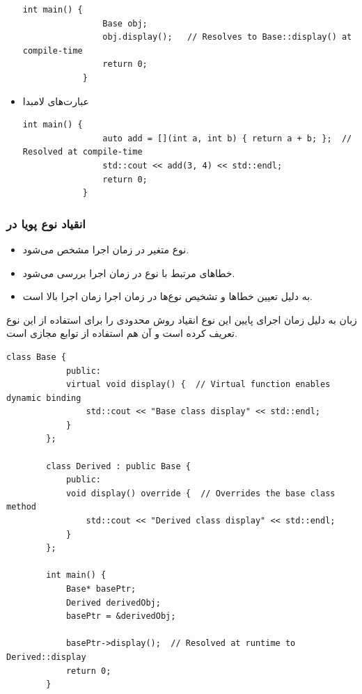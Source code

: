 \documentclass[12pt, a4paper]{report}
\begin{document}
\begin{itemize}
\begin{LTR}
\begin{lstlisting}[breaklines=true]
			int main() {
				Base obj;
				obj.display();   // Resolves to Base::display() at compile-time
				return 0;
			}
		\end{lstlisting}
	\end{LTR}
	
	\item عبارت‌های لامبدا
	\begin{LTR} %
		\begin{lstlisting}[breaklines=true]
			int main() {
				auto add = [](int a, int b) { return a + b; };  // Resolved at compile-time
				std::cout << add(3, 4) << std::endl;
				return 0;
			}
		\end{lstlisting}
	\end{LTR}
	
\end{itemize}


\subsubsection{انقیاد نوع پویا در }
\begin{itemize}
	\item نوع متغیر در زمان اجرا مشخص می‌شود.
	\item خطاهای مرتبط با نوع در زمان اجرا بررسی می‌شود.
	\item به دلیل تعیین خطاها و تشخیص نوع‌ها در زمان اجرا زمان اجرا بالا است.
\end{itemize}

زبان  به دلیل زمان اجرای پایین این نوع انقیاد روش‌ محدودی را برای استفاده از این نوع تعریف کرده است و آن هم استفاده از توابع مجازی است.

\begin{LTR} %
	\begin{lstlisting}[breaklines=true]
		class Base {
			public:
			virtual void display() {  // Virtual function enables dynamic binding
				std::cout << "Base class display" << std::endl;
			}
		};
		
		class Derived : public Base {
			public:
			void display() override {  // Overrides the base class method
				std::cout << "Derived class display" << std::endl;
			}
		};
		
		int main() {
			Base* basePtr;
			Derived derivedObj;
			basePtr = &derivedObj;
			
			basePtr->display();  // Resolved at runtime to Derived::display
			return 0;
		}
	\end{lstlisting}
\end{LTR}
\end{document}
